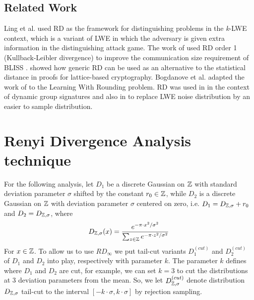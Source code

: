 \subsection{Related Work}
\label{sec:renyiRelatedWorks}
Ling et al. \cite{ling2017hardness} used RD as the framework for distinguishing
problems in the \textit{k}-LWE context, which is a variant of LWE in which the
adversary is given extra information in the distinguishing attack game. The
work of \cite{poppelmann2014enhanced27} used RD order 1 (Kullback-Leibler
divergence) to improve the communication size requirement of BLISS
\cite{ducas2013lattice11}. \cite{bai2015improved5} showed how generic RD can
be used as an alternative to the statistical distance in proofs for
lattice-based cryptography.  Bogdanove et al. \cite{bogdanov2016hardness4}
adapted the work of \cite{bai2015improved5} to the Learning With Rounding
problem. RD was used in \cite{libert2016signature} in the context of dynamic
group signatures and also in \cite{alkim2016post} to replace LWE noise
distribution by an easier to sample distribution.



\section{Renyi Divergence Analysis technique}
\label{sec:secProcRenyi}

For the following analysis, let $D_1$ be a discrete Gaussian on $\mathbb{Z}$ with
standard deviation parameter $\sigma$ shifted by the constant $r_0 \in \mathbb{Z}$, while $D_2$
is a discrete Gaussian on $\mathbb{Z}$ with deviation parameter $\sigma$ centered on zero,
i.e. $D_1 = D_{\mathbb{Z},\sigma} + r_0$ and $D_2 = D_{\mathbb{Z},\sigma}$, where
$$D_{\mathbb{Z},\sigma}(x) = \frac{e^{-\pi \cdot x^2/\sigma^2}}{\sum_{z \in \mathbb{Z}} e^{-\pi \cdot
    z^2/\sigma^2}}$$ For $x \in \mathbb{Z}$. To allow us to use $RD_{\infty}$ we put
tail-cut variants $D_1^{(cut)}$ and $D_2^{(cut)}$ of $D_1$ and $D_2$ into play,
respectively with parameter $k$. The parameter $k$ defines where $D_1$ and $D_2$
are cut, for example, we can set $k=3$ to cut the distributions at 3 deviation
parameters from the mean. So, we let $D_{\mathbb{Z},\sigma}^{(cut)}$ denote
distribution $D_{\mathbb{Z},\sigma}$ tail-cut to the interval
$[-k \cdot \sigma, k \cdot \sigma]$ by rejection sampling.

